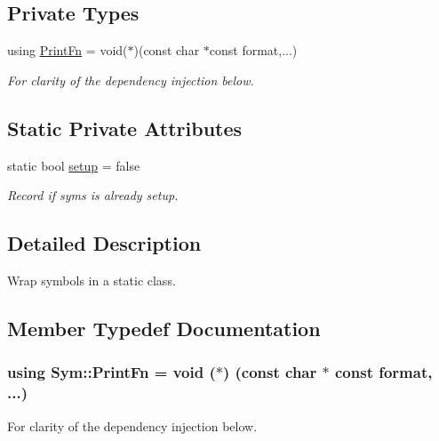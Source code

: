 \subsection*{Private Types}
\begin{DoxyCompactItemize}
\item 
using \hyperlink{struct_sym_a7d4d0c72d65ffac9eb1d1eca78d58992}{Print\+Fn} = void($\ast$)(const char $\ast$const format,...)
\begin{DoxyCompactList}\small\item\em For clarity of the dependency injection below. \end{DoxyCompactList}\end{DoxyCompactItemize}
\subsection*{Static Private Attributes}
\begin{DoxyCompactItemize}
\item 
static bool \hyperlink{struct_sym_a5b0d02c05e1a5450e6dc79903615ab46}{setup} = false
\begin{DoxyCompactList}\small\item\em Record if syms is already setup. \end{DoxyCompactList}\end{DoxyCompactItemize}


\subsection{Detailed Description}
Wrap symbols in a static class. 

\subsection{Member Typedef Documentation}
\subsubsection[{\texorpdfstring{Print\+Fn}{PrintFn}}]{\setlength{\rightskip}{0pt plus 5cm}using {\bf Sym\+::\+Print\+Fn} =  void ($\ast$) (const char $\ast$ const format, ...)\hspace{0.3cm}{\ttfamily [private]}}\hypertarget{struct_sym_a7d4d0c72d65ffac9eb1d1eca78d58992}{}\label{struct_sym_a7d4d0c72d65ffac9eb1d1eca78d58992}


For clarity of the dependency injection below. 



